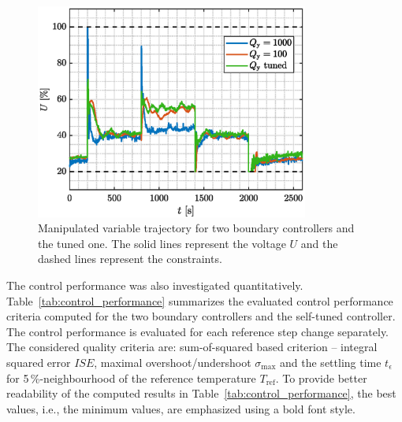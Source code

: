 \documentclass[preprint,12pt]{elsarticle}
\begin{document}
	\begin{figure}
		\begin{center}
			\includegraphics[width=0.8\textwidth]{images/MV}
			\caption{Manipulated variable trajectory for two boundary controllers and the tuned one. The solid lines represent the voltage $U$ and the dashed lines represent the constraints.}
			\label{fig:MV}
		\end{center}
	\end{figure}
	
	The control performance was also investigated quantitatively. Table~\ref{tab:control_performance} summarizes the evaluated control performance criteria computed for the two boundary controllers and the self-tuned controller. The control performance is evaluated for each reference step change separately. The considered quality criteria are: sum-of-squared based criterion -- integral squared error $ISE$, maximal overshoot/undershoot $\sigma_{\mathrm{max}}$ and the settling time $t_{\epsilon}$ for 5\,\%-neighbourhood of the reference temperature $T_{\mathrm{ref}}$. To provide better readability of the computed results in Table~\ref{tab:control_performance}, the best values, i.e., the minimum values, are emphasized using a bold font style. 
	
\end{document}
